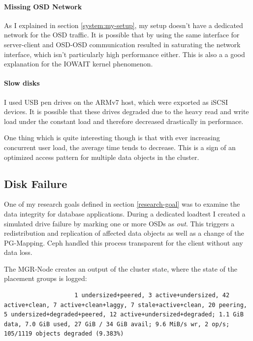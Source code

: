 \documentclass[titlepage, a4paper, 11pt]{scrartcl}
\begin{document}
                \paragraph{Missing OSD Network} As I explained in section \ref*{system:my-setup}, my setup doesn't have a dedicated network for the OSD traffic. It is possible that by using the same interface for server-client and OSD-OSD communication resulted in saturating the network interface, which isn't particularly high performance either. This is also a a good explanation for the IOWAIT kernel phenomenon.

                \paragraph{Slow disks} I used USB pen drives on the ARMv7 host, which were exported as iSCSI devices. It is possible that these drives degraded due to the heavy read and write load under the constant load and therefore decreased drastically in performace.

                One thing which is quite interesting though is that with ever increasing concurrent user load, the average time tends to decrease. This is a sign of an optimized access pattern for multiple data objects in the cluster.

            \subsection{Disk Failure}

                One of my research goals defined in section \ref*{research-goal} was to examine the data integrity for database applications. During a dedicated loadtest I created a simulated drive failure by marking one or more OSDs as \textit{out}. This triggers a redistribution and replication of affected data objects as well as a change of the PG-Mapping. Ceph handled this process transparent for the client without any data loss.

                The MGR-Node creates an output of the cluster state, where the state of the placement groups is logged:

                \begin{lstlisting}
                    1 undersized+peered, 3 active+undersized, 42 active+clean, 7 active+clean+laggy, 7 stale+active+clean, 20 peering, 5 undersized+degraded+peered, 12 active+undersized+degraded; 1.1 GiB data, 7.0 GiB used, 27 GiB / 34 GiB avail; 9.6 MiB/s wr, 2 op/s; 105/1119 objects degraded (9.383%)
                \end{lstlisting}
\end{document}
